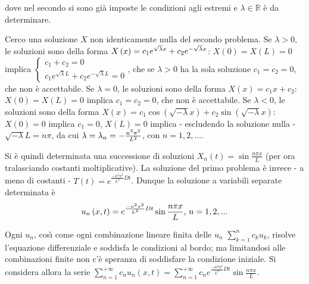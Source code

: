 \documentclass{article}
\begin{document}
dove nel secondo si sono gi\`{a} imposte le condizioni agli estremi e $%
\lambda \in 
\mathbb{R}
$ \`{e} da determinare.

Cerco una soluzione $X$ non identicamente nulla del secondo problema. Se $%
\lambda >0$, le soluzioni sono della forma $X\left( x\right) =c_{1}e^{\sqrt{%
\lambda }x}+c_{2}e^{-\sqrt{\lambda }x}$: $X\left( 0\right) =X\left( L\right)
=0$ implica $\left\{ 
\begin{array}{c}
c_{1}+c_{2}=0 \\ 
c_{1}e^{\sqrt{\lambda }L}+c_{2}e^{-\sqrt{\lambda }L}=0%
\end{array}%
\right. $, che se $\lambda >0$ ha la sola soluzione $c_{1}=c_{2}=0$, che non 
\`{e} accettabile. Se $\lambda =0$, le soluzioni sono della forma $X\left(
x\right) =c_{1}x+c_{2}$: $X\left( 0\right) =X\left( L\right) =0$ implica $%
c_{1}=c_{2}=0$, che non \`{e} accettabile. Se $\lambda <0$, le soluzioni
sono della forma $X\left( x\right) =c_{1}\cos \left( \sqrt{-\lambda }%
x\right) +c_{2}\sin \left( \sqrt{-\lambda }x\right) $: $X\left( 0\right) =0$
implica $c_{1}=0$, $X\left( L\right) =0$ implica - escludendo la soluzione
nulla - $\sqrt{-\lambda }L=n\pi $, da cui $\lambda =\lambda _{n}=-\frac{%
n^{2}\pi ^{2}}{L^{2}}$, con $n=1,2,...$.

Si \`{e} quindi determinata una successione di soluzioni $X_{n}\left(
t\right) =\sin \frac{n\pi x}{L}$ (per ora tralasciando costanti
moltiplicative). La soluzione del primo problema \`{e} invece - a meno di
costanti - $T\left( t\right) =e^{\frac{-n^{2}\pi ^{2}}{L^{2}}Dt}$. Dunque la
soluzione a variabili separate determinata \`{e} 
\begin{equation*}
u_{n}\left( x,t\right) =e^{\frac{-n^{2}\pi ^{2}}{L^{2}}Dt}\sin \frac{n\pi x}{%
L}\text{, }n=1,2,...
\end{equation*}

Ogni $u_{n}$, cos\`{\i} come ogni combinazione lineare finita delle $u_{n}$ $%
\sum_{k=1}^{n}c_{k}u_{k}$, risolve l'equazione differenziale e soddisfa le
condizioni al bordo; ma limitandosi alle combinazioni finite non c'\`{e}
speranza di soddisfare la condizione iniziale. Si considera allora la serie $%
\sum_{n=1}^{+\infty }c_{n}u_{n}\left( x,t\right) =\sum_{n=1}^{+\infty
}c_{n}e^{\frac{-n^{2}\pi ^{2}}{L^{2}}Dt}\sin \frac{n\pi x}{L}$.
\end{document}
